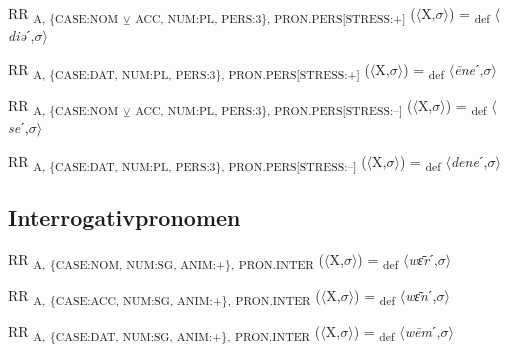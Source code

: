 {\begin{exe}
 RR \textsubscript{A, \{CASE:NOM} \textsubscript{${\veebar}$}\textsubscript{ ACC, NUM:PL, PERS:3\}, PRON.PERS[STRESS:+]} ($\langle$X,$\sigma $$\rangle$) = \textsubscript{def} $\langle$\textit{diə}ˊ,$\sigma $$\rangle$
\end{exe}

\begin{exe}
 RR \textsubscript{A, \{CASE:DAT, NUM:PL, PERS:3\}, PRON.PERS[STRESS:+]} ($\langle$X,$\sigma $$\rangle$) = \textsubscript{def} $\langle$\textit{\=ene}ˊ,$\sigma $$\rangle$
\end{exe}

\begin{exe}
 RR \textsubscript{A, \{CASE:NOM} \textsubscript{${\veebar}$}\textsubscript{ ACC, NUM:PL, PERS:3\}, PRON.PERS[STRESS:–]} ($\langle$X,$\sigma $$\rangle$) = \textsubscript{def} $\langle$\textit{se}ˊ,$\sigma $$\rangle$
\end{exe}

\begin{exe}
 RR \textsubscript{A, \{CASE:DAT, NUM:PL, PERS:3\}, PRON.PERS[STRESS:–]} ($\langle$X,$\sigma $$\rangle$) = \textsubscript{def} $\langle$\textit{dene}ˊ,$\sigma $$\rangle$
\end{exe}

\subsection{Interrogativpronomen}

\begin{exe}
 RR \textsubscript{A,} \textsubscript{\{CASE:NOM, NUM:SG, ANIM:+\},} \textsubscript{PRON.INTER} ($\langle$X,$\sigma $$\rangle$) = \textsubscript{def} $\langle$\textit{w\=ɛr}ˊ,$\sigma $$\rangle$
\end{exe}

\begin{exe}
 RR \textsubscript{A,} \textsubscript{\{CASE:ACC, NUM:SG, ANIM:+\},} \textsubscript{PRON.INTER} ($\langle$X,$\sigma $$\rangle$) = \textsubscript{def} $\langle$\textit{w\=ɛn}ˊ,$\sigma $$\rangle$
\end{exe}

\begin{exe}
 RR \textsubscript{A,} \textsubscript{\{CASE:DAT, NUM:SG, ANIM:+\},} \textsubscript{PRON.INTER} ($\langle$X,$\sigma $$\rangle$) = \textsubscript{def} $\langle$\textit{w\=em}ˊ,$\sigma $$\rangle$
\end{exe}

}
